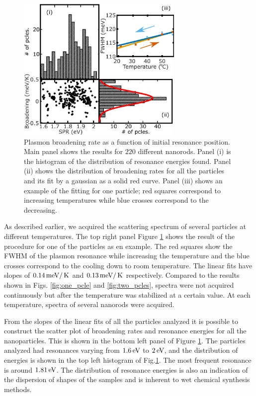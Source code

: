 \begin{figure}[tp] \centering
\includegraphics[width=8cm]{Chapters/05_WhiteLight/Figures/04_Many_Pcles/04_Many_Particles.png}
\caption{Plasmon broadening rate as a function of initial resonance position.
Main panel shows the results for $220$ different nanorods. Panel (i) is the histogram
of the distribution of resonance energies found. Panel (ii) shows the
distribution of broadening rates for all the particles and its fit by a gaussian
as a solid red curve. Panel (iii) shows an example of the fitting for one
particle; red squares correspond to increasing temperatures while blue crosses
correspond to the decreasing.}
		\label{fig:many-pcles}
\end{figure}

As described earlier, we acquired the scattering spectrum of several particles
at different temperatures. The top right panel Figure \ref{fig:many-pcles} shows
the result of the procedure for one of the particles as en example. The red
squares show the FWHM of the plasmon resonance while increasing the
temperature and the blue crosses correspond to the cooling down to room
temperature. The linear fits have slopes of $0.14\,\textrm{meV}/\,\textrm{K}$ and $0.13\,\textrm{meV}/\,\textrm{K}$
respectively. Compared to the results shown in Figs. \ref{fig:one_pcle} and
\ref{fig:two_pcles}, spectra were not acquired continuously but after the
temperature was stabilized at a certain value. At each temperature, spectra
of several nanorods were acquired.

From the slopes of the linear fits of all the particles analyzed it is possible
to construct the scatter plot of broadening rates and resonance energies for all
the nanoparticles. This is shown in the bottom left panel of Figure
\ref{fig:many-pcles}. The particles analyzed had resonances varying from
$1.6\,\textrm{eV}$ to $2\,\textrm{eV}$, and the distribution of energies is shown in the top left
histogram of Fig.\ref{fig:many-pcles}. The most frequent resonance is around
$1.81\,\textrm{eV}$. The distribution of resonance energies is also an indication of the
dispersion of shapes of the samples and is inherent to wet chemical synthesis
methods.

